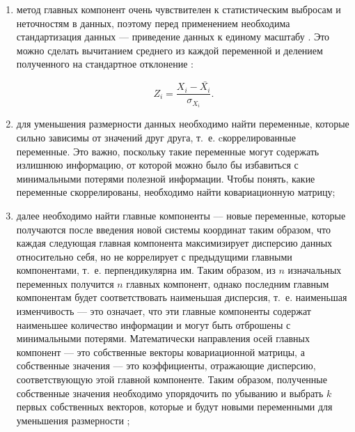 \begin{enumerate}
	\item метод главных компонент очень чувствителен к статистическим выбросам и неточностям в данных, поэтому перед применением необходима стандартизация данных –-- приведение данных к единому масштабу \cite{polyak, zakaria}. Это можно сделать вычитанием среднего из каждой переменной и делением полученного на стандартное отклонение \cite{zakaria}:
	
	\begin{equation}\label{eq:normalization_Z1}
		Z_i = \frac{{X_i - \bar{X_i}}}{{\sigma_{X_i}}}.
	\end{equation}
	\item для уменьшения размерности данных необходимо найти переменные, которые сильно зависимы от значений друг друга, т.~е. cкоррелированные переменные. Это важно, поскольку такие переменные могут содержать излишнюю информацию, от которой можно было бы избавиться с минимальными потерями полезной информации. Чтобы понять, какие переменные скоррелированы, необходимо найти ковариационную матрицу;
	\item далее необходимо найти главные компоненты –-- новые переменные, которые получаются после введения новой системы координат таким образом, что каждая следующая главная компонента максимизирует дисперсию данных относительно себя, но не коррелирует с предыдущими главными компонентами, т.~е. перпендикулярна им. Таким образом, из $n$ изначальных переменных получится $n$ главных компонент, однако последним главным компонентам будет соответствовать наименьшая дисперсия, т.~е. наименьшая изменчивость --– это означает, что эти главные компоненты содержат наименьшее количество информации и могут быть отброшены с минимальными потерями. Математически направления осей главных компонент –-- это собственные векторы ковариационной матрицы, а собственные значения –-- это коэффициенты, отражающие дисперсию, соответствующую этой главной компоненте. Таким образом, полученные собственные значения необходимо упорядочить по убыванию и выбрать $k$ первых собственных векторов, которые и будут новыми переменными для уменьшения размерности \cite{orlov, polyak, zakaria};
	

\end{enumerate}
